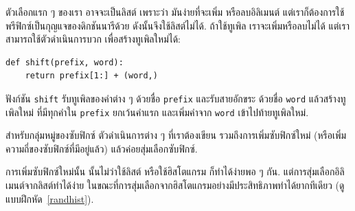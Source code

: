 
ตัวเลือกแรก ๆ ของเรา อาจจะเป็นลิสต์
เพราะว่า มันง่ายที่จะเพิ่ม หรือลบอิลิเมนต์
แต่เราก็ต้องการใช้พรีฟิกซ์เป็นกุญแจของดิกชันนารีด้วย
ดังนั้นจึงใช้ลิสต์ไม่ได้.
ถ้าใช้ทูเพิล เราจะเพิ่มหรือลบไม่ได้ แต่เราสามารถใช้ตัวดำเนินการบวก เพื่อสร้างทูเพิลใหม่ได้:

\begin{verbatim}
def shift(prefix, word):
    return prefix[1:] + (word,)
\end{verbatim}
%
%
ฟังก์ชัน \texttt{shift} รับทูเพิลของคำต่าง ๆ ด้วยชื่อ \texttt{prefix}
และรับสายอักขระ ด้วยชื่อ \texttt{word}
แล้วสร้างทูเพิลใหม่ ที่มีทุกคำใน \texttt{prefix} ยกเว้นคำแรก
และเพิ่มคำจาก \texttt{word} เข้าไปท้ายทูเพิลใหม่.


สำหรับกลุ่มหมู่ของซับฟิกซ์
ตัวดำเนินการต่าง ๆ ที่เราต้องเขียน รวมถึงการเพิ่มซับฟิกซ์ใหม่
(หรือเพิ่มความถี่ของซับฟิกซ์ที่มีอยู่แล้ว)
แล้วค่อยสุ่มเลือกซับฟิกซ์.


การเพิ่มซับฟิกซ์ใหม่นั้น นั้นไม่ว่าใช้ลิสต์ หรือใช้ฮิสโตแกรม ก็ทำได้ง่ายพอ ๆ กัน.
แต่การสุ่มเลือกอิลิเมนต์จากลิสต์ทำได้ง่าย
ในขณะที่การสุ่มเลือกจากฮิสโตแกรมอย่างมีประสิทธิภาพทำได้ยากทีเดียว
(ดูแบบฝึกหัด~\ref{randhist}).


